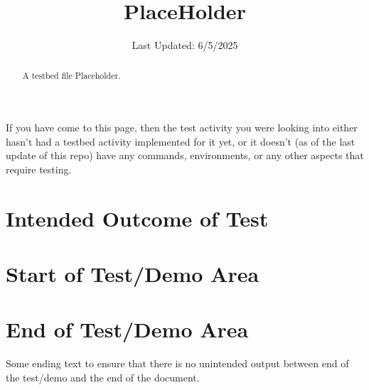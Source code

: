 \documentclass{ximera}
\title{PlaceHolder}
\date{Last Updated: 6/5/2025}
\begin{document}
\begin{abstract}
    A testbed file Placeholder.
\end{abstract}
\maketitle

If you have come to this page, then the test activity you were looking into either hasn't had a testbed activity implemented for it yet, 
or it doesn't (as of the last update of this repo) have any commands, environments, or any other aspects that require testing.

\section{Intended Outcome of Test}

\section{Start of Test/Demo Area}

\section{End of Test/Demo Area}

Some ending text to ensure that there is no unintended output between end of the test/demo and the end of the document.
\end{document}
